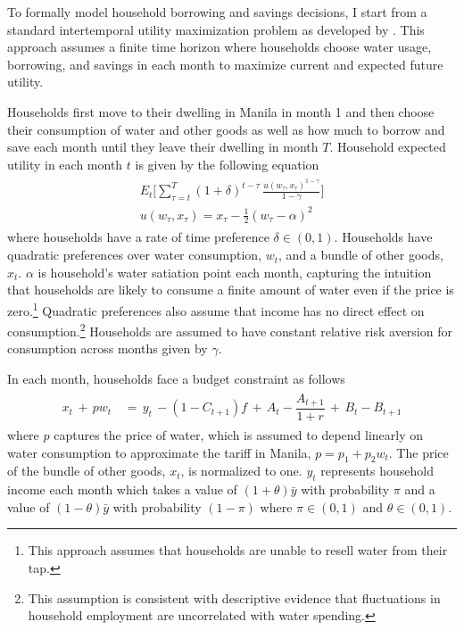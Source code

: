 \documentclass[12pt]{article}
\begin{document}
To formally model household borrowing and savings decisions, I start from a standard intertemporal utility maximization problem as developed by \cite{deaton1991saving}.  This approach assumes a finite time horizon where households choose water usage, borrowing, and savings in each month to maximize current and expected future utility.  

Households first move to their dwelling in Manila in month 1 and then choose their consumption of water and other goods as well as how much to borrow and save each month until they leave their dwelling in month $T$.  Household expected utility in each month $t$ is given by the following equation
\begin{align}\label{eq:u}
\begin{split}
E_t \Big[ \sum_{\tau = t}^{T} (1+\delta)^{t-\tau} \,\frac{u(w_{\tau},x_{\tau})^{1-\gamma}}{1-\gamma}   \Big]\\
u(w_{\tau},x_{\tau}) =  x_{\tau} -  \frac{1}{2} (w_{\tau} - \alpha)^2
\end{split} 
\end{align}
where households have a rate of time preference $\delta \in (0,1)$.  Households have quadratic preferences over water consumption, $w_{t}$, and a bundle of other goods, $x_{t}$.  $\alpha$ is household's water satiation point each month, capturing the intuition that households are likely to consume a finite amount of water even if the price is zero.\footnote{This approach assumes that households are unable to resell water from their tap.}  Quadratic preferences also assume that income has no direct effect on consumption.\footnote{This assumption is consistent with descriptive evidence that fluctuations in household employment are uncorrelated with water spending.}  Households are assumed to have constant relative risk aversion for consumption across months given by $\gamma$.

In each month, households face a budget constraint as follows
\begin{align}\label{eq:bc}
\begin{split}
x_t \, + \, p w_t \, &= \, y_t \, - (1-C_{t+1})f  \, + \,  A_t  - \dfrac{A_{t+1}}{1+r}   \, + \,  B_t - B_{t+1} 
\end{split}
\end{align}
where $p$ captures the price of water, which is assumed to depend linearly on water consumption to approximate the tariff in Manila, $p=p_1+p_2w_t$.   The price of the bundle of other goods, $x_t$, is normalized to one.  $y_t$ represents household income each month which takes a value of $(1+\theta)\bar{y}$ with probability $\pi$ and a value of $(1-\theta)\bar{y}$ with probability $(1-\pi)$ where $\pi \in (0,1)$ and $\theta  \in (0,1)$.  
\end{document}
